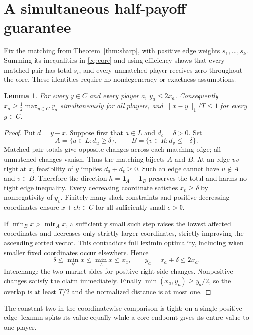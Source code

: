 \documentclass[11pt]{article}
\newtheorem{lemma}[theorem]{Lemma}
\begin{document}
\section{A simultaneous half-payoff guarantee}
Fix the matching from Theorem~\ref{thm:sharp}, with positive edge weights
$s_1,\ldots,s_k$. Summing its inequalities in \eqref{eq:core} and using
efficiency shows that every matched pair has total $s_i$, and every
unmatched player receives zero throughout the core. These identities
require no nondegeneracy or exactness assumptions.
\begin{lemma}\label{lem:half}
For every $y\in C$ and every player $a$, $y_a\le2x_a$.
Consequently $x_a\ge\tfrac12\max_{y\in C}y_a$ simultaneously for all
players, and $\|x-y\|_1/T\le1$ for every $y\in C$.
\end{lemma}
\begin{proof}
Put $d=y-x$. Suppose first that $a\in L$ and $d_a=\delta>0$. Set
\[
 A=\{u\in L:d_u\ge\delta\},\qquad
 B=\{v\in R:d_v\le-\delta\}.
\]
Matched-pair totals give opposite changes across each matching edge;
all unmatched changes vanish. Thus the matching bijects $A$ and $B$.
At an edge $uv$ tight at $x$, feasibility of $y$ implies
$d_u+d_v\ge0$. Such an edge cannot have $u\notin A$ and $v\in B$.
Therefore the direction $h=\mathbf1_A-\mathbf1_B$ preserves the total
and harms no tight edge inequality. Every decreasing coordinate satisfies
$x_v\ge\delta$ by nonnegativity of $y_v$. Finitely many slack constraints
and positive decreasing coordinates ensure $x+\epsilon h\in C$ for all
sufficiently small $\epsilon>0$.

If $\min_Bx>\min_Ax$, a sufficiently small such step raises the lowest
affected coordinates and decreases only strictly larger coordinates,
strictly improving the ascending sorted vector. This contradicts full
leximin optimality, including when smaller fixed coordinates occur
elsewhere. Hence
\[
 \delta\le\min_Bx\le\min_Ax\le x_a,
 \qquad y_a=x_a+\delta\le2x_a.
\]
Interchange the two market sides for positive right-side changes.
Nonpositive changes satisfy the claim immediately. Finally
$\min(x_a,y_a)\ge y_a/2$, so the overlap is at least $T/2$ and the
normalized distance is at most one.
\end{proof}
The constant two in the coordinatewise comparison is tight: on a
single positive edge, leximin splits its value equally while a core
endpoint gives its entire value to one player.
\end{document}
